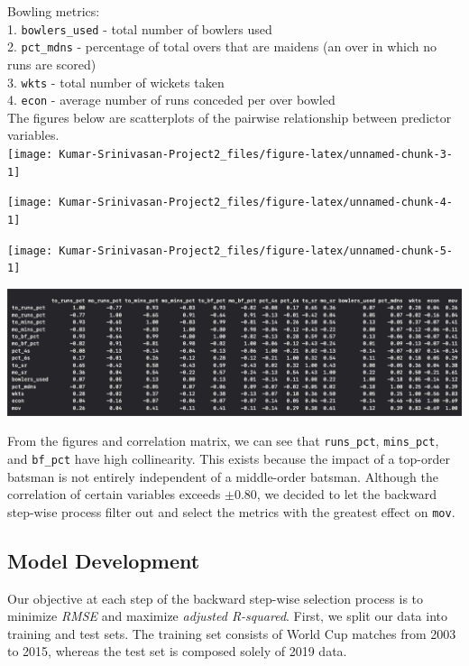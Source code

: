 \documentclass[
]{article}
\begin{document}
Bowling metrics:\\
1. \texttt{bowlers\_used} - total number of bowlers used\\
2. \texttt{pct\_mdns} - percentage of total overs that are maidens (an
over in which no runs are scored)\\
3. \texttt{wkts} - total number of wickets taken\\
4. \texttt{econ} - average number of runs conceded per over bowled\\

The figures below are scatterplots of the pairwise relationship between
predictor variables.\\

\texttt{[image: Kumar-Srinivasan-Project2\_files/figure-latex/unnamed-chunk-3-1]}

\texttt{[image: Kumar-Srinivasan-Project2\_files/figure-latex/unnamed-chunk-4-1]}

\texttt{[image: Kumar-Srinivasan-Project2\_files/figure-latex/unnamed-chunk-5-1]}

\includegraphics[width=1\linewidth]{cor}

From the figures and correlation matrix, we can see that
\texttt{runs\_pct}, \texttt{mins\_pct}, and \texttt{bf\_pct} have high
collinearity. This exists because the impact of a top-order batsman is
not entirely independent of a middle-order batsman. Although the
correlation of certain variables exceeds \(\pm 0.80\), we decided to let
the backward step-wise process filter out and select the metrics with
the greatest effect on \texttt{mov}.

\hypertarget{model-development}{%
\subsection{Model Development}\label{model-development}}

Our objective at each step of the backward step-wise selection process
is to minimize \emph{RMSE} and maximize \emph{adjusted R-squared}.
First, we split our data into training and test sets. The training set
consists of World Cup matches from 2003 to 2015, whereas the test set is
composed solely of 2019 data.\\
\end{document}
